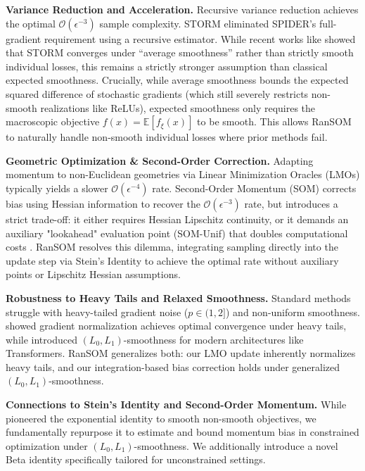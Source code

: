 \documentclass{article}
\theoremstyle{plain}
\theoremstyle{definition}
\theoremstyle{remark}
\begin{document}
\textbf{Variance Reduction and Acceleration.} 
Recursive variance reduction achieves the optimal $\mathcal{O}(\epsilon^{-3})$ sample complexity. STORM \cite{cutkosky2019storm} eliminated SPIDER's \cite{fang2018spider} full-gradient requirement using a recursive estimator. While  recent works like \citet{khirirat2025better} showed that STORM converges under ``average smoothness'' rather than strictly smooth individual losses, this remains a strictly stronger assumption than classical expected smoothness. Crucially, while average smoothness bounds the expected squared difference of stochastic gradients (which still severely restricts non-smooth realizations like ReLUs), expected smoothness only requires the macroscopic objective $f(x) = \mathbb{E}[f_\xi(x)]$ to be smooth. This allows RanSOM to naturally handle non-smooth individual losses where prior methods fail.

\textbf{Geometric Optimization \& Second-Order Correction.}
Adapting momentum to non-Euclidean geometries via Linear Minimization Oracles (LMOs) \cite{jordan2024muon, pethick2025training, kovalev2025non} typically yields a slower $\mathcal{O}(\epsilon^{-4})$ rate. Second-Order Momentum (SOM) corrects bias using Hessian information \cite{tran2022better, khirirat2025better} to recover the $\mathcal{O}(\epsilon^{-3})$ rate, but introduces a strict trade-off: it either requires Hessian Lipschitz continuity, or it demands an auxiliary "lookahead" evaluation point (SOM-Unif) that doubles computational costs \cite{zhang2020one, salehkaleybar2022momentum, sadiev2025second, khirirat2025better}. RanSOM resolves this dilemma, integrating sampling directly into the update step via Stein's Identity to achieve the optimal rate without auxiliary points or Lipschitz Hessian assumptions.

\textbf{Robustness to Heavy Tails and Relaxed Smoothness.} 
Standard methods struggle with heavy-tailed gradient noise ($p \in (1, 2]$) and non-uniform smoothness. \citet{hubler2025gradient} showed gradient normalization achieves optimal convergence under heavy tails, while \citet{chen2023generalized} introduced $(L_0, L_1)$-smoothness for modern architectures like Transformers. RanSOM generalizes both: our LMO update inherently normalizes heavy tails, and our integration-based bias correction holds under generalized $(L_0, L_1)$-smoothness.

\textbf{Connections to Stein's Identity and Second-Order Momentum.} 
While \citet{zhang2024random} pioneered the exponential identity to smooth non-smooth objectives, we fundamentally repurpose it to estimate and bound momentum bias in constrained optimization under $(L_0, L_1)$-smoothness. We additionally introduce a novel Beta identity specifically tailored for unconstrained settings. 
\end{document}
